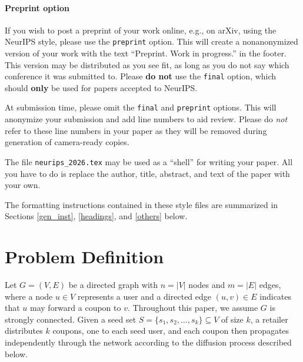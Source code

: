 \documentclass{article}
\begin{document}
\paragraph{Preprint option}
If you wish to post a preprint of your work online, e.g., on arXiv, using the NeurIPS style, please use the \verb+preprint+ option. This will create a nonanonymized version of your work with the text ``Preprint. Work in progress.'' in the footer. This version may be distributed as you see fit, as long as you do not say which conference it was submitted to. Please \textbf{do not} use the \verb+final+ option, which should \textbf{only} be used for papers accepted to NeurIPS.


At submission time, please omit the \verb+final+ and \verb+preprint+ options. This will anonymize your submission and add line numbers to aid review. Please do \emph{not} refer to these line numbers in your paper as they will be removed during generation of camera-ready copies.


The file \verb+neurips_2026.tex+ may be used as a ``shell'' for writing your paper. All you have to do is replace the author, title, abstract, and text of the paper with your own.


The formatting instructions contained in these style files are summarized in Sections \ref{gen_inst}, \ref{headings}, and \ref{others} below.
















\section{Problem Definition}

Let $G = (V, E)$ be a directed graph with $n = |V|$ nodes and $m = |E|$ edges, where a node $u \in V$ represents a user and a directed edge $(u, v) \in E$ indicates that $u$ may forward a coupon to $v$. Throughout this paper, we assume $G$ is strongly connected. Given a seed set $S = \{s_1, s_2, \ldots, s_k\} \subseteq V$ of size $k$, a retailer distributes $k$ coupons, one to each seed user, and each coupon then propagates independently through the network according to the diffusion process described below.
\end{document}
